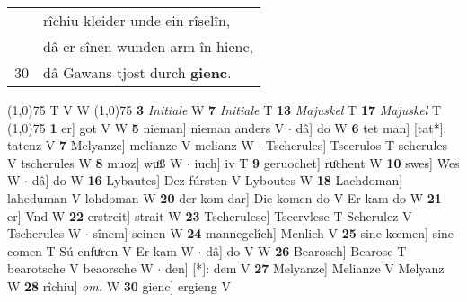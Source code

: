 \documentclass[8pt,a4paper,notitlepage]{article}
\begin{document}
\begin{table}[ht]
\begin{minipage}[t]{0.5\linewidth}
\begin{tabular}{rl}
 & rîchiu kleider unde ein rîselîn,\\ 
 & dâ er sînen wunden arm în hienc,\\ 
30 & dâ Gawans tjost durch \textbf{gienc}.\\ 
\end{tabular}
\scriptsize
\line(1,0){75} \newline
T V W \newline
\line(1,0){75} \newline
\textbf{3} \textit{Initiale} W  \textbf{7} \textit{Initiale} T  \textbf{13} \textit{Majuskel} T  \textbf{17} \textit{Majuskel} T  \newline
\line(1,0){75} \newline
\textbf{1} er] got V W \textbf{5} nieman] nieman anders V  $\cdot$ dâ] do W \textbf{6} tet man] [tat*]: tatenz V \textbf{7} Melyanze] melianze V melianz W  $\cdot$ Tscherules] Tscerulos T scherules V tscherules W \textbf{8} muoz] wuͦß W  $\cdot$ iuch] iv T \textbf{9} geruochet] ruͦchent W \textbf{10} swes] Wes W  $\cdot$ dâ] do W \textbf{16} Lybautes] Dez fúrsten V Lyboutes W \textbf{18} Lachdoman] laheduman V lohdoman W \textbf{20} der kom dar] Die komen do V Er kam do W \textbf{21} er] Vnd W \textbf{22} erstreit] strait W \textbf{23} Tscherulese] Tscervlese T Scherulez V Tscherules W  $\cdot$ sînem] seinen W \textbf{24} mannegelîch] Menlich V \textbf{25} sine kœmen] sine comen T Sú enfuͤren V Er kam W  $\cdot$ dâ] do V W \textbf{26} Bearosch] Bearosc T bearotsche V beaorsche W  $\cdot$ den] [*]: dem V \textbf{27} Melyanze] Melianze V Melyanz W \textbf{28} rîchiu] \textit{om.} W \textbf{30} gienc] ergieng V \newline
\end{minipage}
\end{table}
\end{document}
